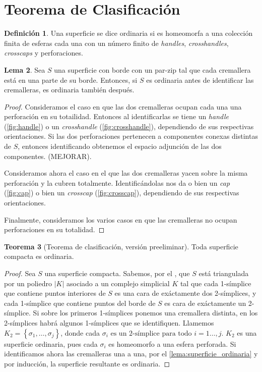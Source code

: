 \documentclass[10pt]{report}
\theoremstyle{definition}
\newtheorem{defin}{Definición}[section]
\newtheorem{tma}[defin]{Teorema}
\newtheorem{lema}[defin]{Lema}
\begin{document}
\section{Teorema de Clasificación}

\begin{defin}%
Una superficie se dice ordinaria si es homeomorfa a una colección finita de esferas cada una con un número finito de \textit{handles}, \textit{crosshandles}, \textit{crosscaps} y perforaciones.
\end{defin}


\begin{lema}%
Sea $S$ una superficie con borde con un par-zip tal que cada cremallera está en una parte de su borde. Entonces, si $S$ es ordinaria antes de identificar las cremalleras, es ordinaria también después.\label{lema:superficie_ordinaria}
\end{lema}
\begin{proof}
Consideramos el caso en que las dos cremalleras ocupan cada una una perforación en su totailidad. Entonces al identificarlas se tiene un \textit{handle} (\autoref{fig:handle}) o un \textit{crosshandle} (\autoref{fig:crosshandle}), dependiendo de sus respectivas orientaciones. Si las dos perforaciones pertenecen a componentes conexas distintas de $S$, entonces identificando obtenemos el espacio adjunción de las dos componentes. (MEJORAR). 

Consideramos ahora el caso en el que las dos cremalleras yacen sobre la misma perforación y la cubren totalmente. Identificándolas nos da o bien un \textit{cap} (\autoref{fig:cap}) o bien un \textit{crosscap} (\autoref{fig:crosscap}), dependiendo de sus respectivas orientaciones.

Finalmente, consideramos los varios casos en que las cremalleras no ocupan perforaciones en su totalidad. 
\end{proof}

\begin{tma}[Teorema de clasificación, versión preeliminar] %
Toda superficie compacta es ordinaria.
\end{tma}
\begin{proof}
Sea $S$ una superficie compacta. Sabemos, por el , que $S$ está triangulada por un poliedro $|K|$ asociado a un complejo simplicial $K$ tal que cada 1-símplice que contiene puntos interiores de $S$ es una cara de exáctamente dos 2-símplices, y cada 1-símplice que contiene puntos del borde de $S$ es cara de exáctamente un 2-símplice. Si sobre los primeros 1-símplices ponemos una cremallera distinta, en los 2-símplices habrá algunos 1-símplices que se identifiquen. Llamemos $K_2=\left\{\sigma_1,\dots ,\sigma_j\right\}$, donde cada $\sigma_i \text{ es un 2-símplice para todo } i=1\dots ,j$. $K_2$ es una superficie ordinaria, pues cada $\sigma_i$ es homeomorfo a una esfera perforada. Si identificamos ahora las cremalleras una a una, por el \autoref{lema:superficie_ordinaria} y por inducción, la superficie resultante es ordinaria.
\end{proof}
\end{document}
